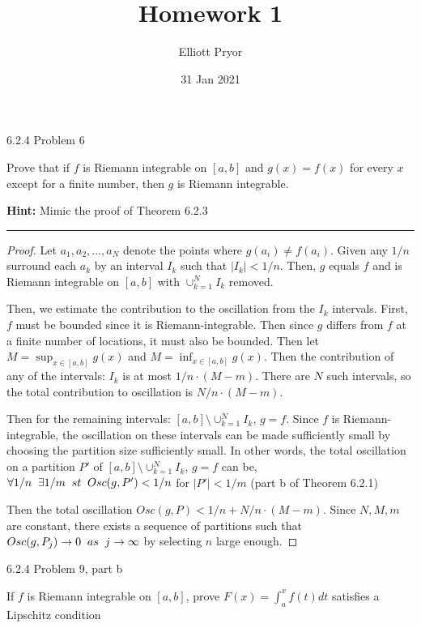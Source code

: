 \documentclass[11pt]{article}
\title{Homework 1}
\author{Elliott Pryor}
\date{31 Jan 2021}
\begin{document}
\maketitle

 6.2.4 Problem 6

Prove that if $f$ is Riemann integrable on $[a, b]$ and $g(x) = f(x)$ for
every $x$ except for a finite number, then $g$ is Riemann integrable.

\textbf{Hint:} Mimic the proof of Theorem 6.2.3

\hrule

\begin{proof}
    
    Let $a_1, a_2, ..., a_N$ denote the points where $g(a_i) \neq f(a_i)$.
    Given any $1/n$ surround each $a_k$ by an interval $I_k$ such that $|I_k| < 1/n$. Then,
    $g$ equals $f$ and is Riemann integrable on $[a,b]$ with $\cup_{k = 1} ^N I_k$ removed.

    Then, we estimate the contribution to the oscillation from the $I_k$ intervals. First, $f$ must be bounded since
    it is Riemann-integrable. Then since $g$ differs from $f$ at a finite number of locations, it must also be bounded. 
    Then let $M = \sup _{x \in [a,b]} g(x)$ and $M = \inf _{x \in [a,b]} g(x)$. Then the contribution of any of the intervals:
    $I_k$ is at most $1/n \cdot (M-m)$. There are $N$ such intervals, so the total contribution to oscillation is $N/n \cdot (M - m)$.

    Then for the remaining intervals: $[a,b] \setminus \cup_{k = 1} ^N I_k$, $g = f$. Since $f$ is Riemann-integrable,
    the oscillation on these intervals can be made sufficiently small by choosing the partition size sufficiently small. 
    In other words, the total oscillation on a partition $P'$ of $[a,b] \setminus \cup_{k = 1} ^N I_k$, $g = f$ can be,
    $\forall 1/n \sp \exists 1/m \sp st \sp Osc(g, P') < 1/n$ for $|P'| < 1/m$ (part b of Theorem 6.2.1)

    Then the total oscillation $Osc(g, P) < 1/n + N/n \cdot (M - m)$. Since $N, M, m$ are constant, there exists a sequence of 
    partitions such that $Osc(g, P_j) \to 0 \sp as \sp j \to \infty$ by selecting $n$ large enough.


\end{proof}



 6.2.4 Problem 9, part b

If $f$ is Riemann integrable on $[a, b]$, prove $F(x) = \int_a ^x f(t) dt$ satisfies a Lipschitz condition
\end{document}
